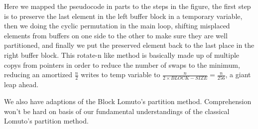 \documentclass[a4paper,oneside,12pt]{book}
\begin{document}
Here we mapped the pseudocode in parts to the steps in the figure, the first step is to preserve the last element in the left buffer block in a temporary variable,
then we doing the cyclic permutation in the main loop, shifting misplaced elements from buffers on one side to the other to make sure they are well partitioned, and finally we put the preserved element back to the last place in the right buffer block.
This rotate-n like method is basically made up of multiple copys from pointers in order to reduce the number of swaps to the minimum, reducing an amortized $\frac{n}{2}$ writes to temp variable to $\frac{n}{2 \times BLOCK-SIZE} = \frac{n}{256}$, a giant leap ahead.

We also have adaptions of the Block Lomuto's partition method. Comprehension won't be hard on basis of our fundamental understandings of the classical Lomuto's partition method.
\end{document}
